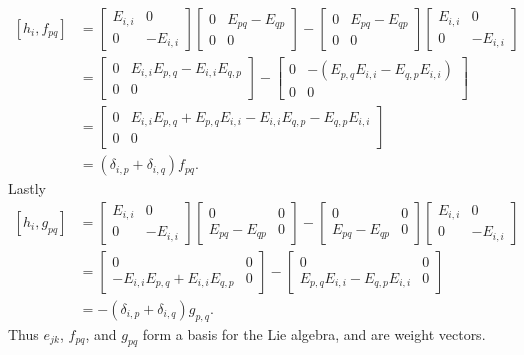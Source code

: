 \begin{subequations}
\begin{align}
[h_{i},f_{pq}]&=
\begin{bmatrix}E_{i,i}&0\\0&-E_{i,i}\end{bmatrix}
\begin{bmatrix}
0&E_{pq}-E_{qp}\\
 0&0
 \end{bmatrix}
-\begin{bmatrix}
0&E_{pq}-E_{qp}\\
 0&0
 \end{bmatrix}
\begin{bmatrix}E_{i,i}&0\\0&-E_{i,i}\end{bmatrix}\\
&=\begin{bmatrix}
0&E_{i,i}E_{p,q}-E_{i,i}E_{q,p}\\
0&0
\end{bmatrix}
-\begin{bmatrix}0&-(E_{p,q}E_{i,i}-E_{q,p}E_{i,i})\\
0&0\end{bmatrix}\\
&=\begin{bmatrix}
0&E_{i,i}E_{p,q}+E_{p,q}E_{i,i}-E_{i,i}E_{q,p}-E_{q,p}E_{i,i}\\
0&0
\end{bmatrix}\\
&=(\delta_{i,p}+\delta_{i,q})f_{pq}.
\end{align}
\end{subequations}
Lastly
\begin{subequations}
\begin{align}
[h_{i},g_{pq}]&=
\begin{bmatrix}E_{i,i}&0\\0&-E_{i,i}\end{bmatrix}
\begin{bmatrix}
0&0\\
E_{pq}-E_{qp} &0
 \end{bmatrix}
-\begin{bmatrix}
0&0\\
E_{pq}-E_{qp}&0
 \end{bmatrix}
\begin{bmatrix}E_{i,i}&0\\0&-E_{i,i}\end{bmatrix}\\
&=\begin{bmatrix}0&0\\
-E_{i,i}E_{p,q}+E_{i,i}E_{q,p}&0
\end{bmatrix}
-\begin{bmatrix}
0&0\\
E_{p,q}E_{i,i}-E_{q,p}E_{i,i}&0
\end{bmatrix}\\
&=-(\delta_{i,p}+\delta_{i,q})g_{p,q}.
\end{align}
\end{subequations}
Thus $e_{jk}$, $f_{pq}$, and $g_{pq}$ form a basis for the Lie
algebra, and are weight vectors.


